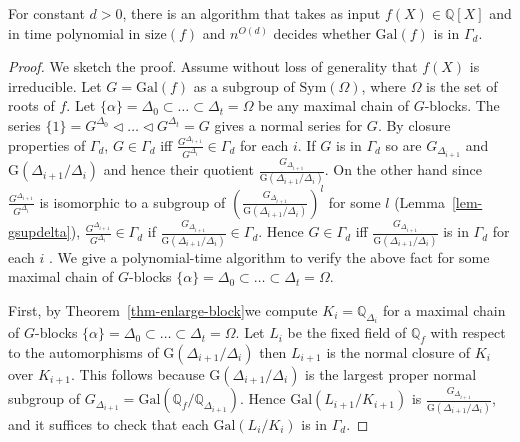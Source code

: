 \documentclass{llncs}
\newcommand{\size}[1]{{\ensuremath{\mathrm{size}\left(#1\right)}}}
\newcommand{\Gal}[1]{{\ensuremath{\mathrm{Gal}\left(#1\right)}}}
\newcommand{\Gof}[1]{{\ensuremath{\mathrm{G}\left(#1\right)}}}
\newcommand{\Sym}[1]{{\ensuremath{\mathrm{Sym}\left(#1\right)}}}
\newcommand{\Q}{\ensuremath{\mathbb{Q}}}
\begin{document}
\begin{theorem}\label{thm-gammad-test}
  For constant $d>0$, there is an algorithm that takes as input $f(X)
  \in \Q[X]$ and in time polynomial in $\size{f}$ and $n^{O(d)}$
  decides whether $\Gal{f}$ is in $\Gamma_d$.
\end{theorem}
\begin{proof}
  We sketch the proof. Assume without loss of generality that $f(X)$
  is irreducible.  Let $G=\Gal{f}$ as a subgroup of $\Sym{\Omega}$,
  where $\Omega$ is the set of roots of $f$. Let $\{ \alpha \} =
  \Delta_0 \subset \ldots \subset \Delta_t = \Omega$ be any maximal
  chain of $G$-blocks. The series $ \{ 1 \} = G^{\Delta_0} \lhd \ldots
  \lhd G^{\Delta_t} = G$ gives a normal series for $G$. By closure
  properties of $\Gamma_d$, $G\in \Gamma_d$ iff
  $\frac{G^{\Delta_{i+1}}}{G^{\Delta_i}}\in\Gamma_d$ for each $i$. If
  $G$ is in $\Gamma_d$ so are $G_{\Delta_{i+1}}$ and
  $\Gof{\Delta_{i+1}/\Delta_i}$ and hence their quotient
  $\frac{G_{\Delta_{i+1}}}{\Gof{\Delta_{i+1}/\Delta_i}}$. On the other
  hand since $\frac{G^{\Delta_{i+1}}}{G^{\Delta_i}}$ is isomorphic to
  a subgroup of
  $\left(\frac{G_{\Delta_{i+1}}}{\Gof{\Delta_{i+1}/\Delta_i}}\right)^l$
  for some $l$ (Lemma~\ref{lem-gsupdelta}),
  $\frac{G^{\Delta_{i+1}}}{G^{\Delta_i}}\in\Gamma_d$ if
  $\frac{G_{\Delta_{i+1}}}{\Gof{\Delta_{i+1}/\Delta_i}}\in\Gamma_d$.
  Hence $G\in\Gamma_d$ iff
  $\frac{G_{\Delta_{i+1}}}{\Gof{\Delta_{i+1}/\Delta_i}}$ is in
  $\Gamma_d$ for each $i$ . We give a polynomial-time algorithm to
  verify the above fact for some maximal chain of $G$-blocks $\{
  \alpha \} = \Delta_0 \subset \ldots \subset \Delta_t = \Omega$.

  First, by Theorem~\ref{thm-enlarge-block}we compute $K_i =
  \Q_{\Delta_i}$ for a maximal chain of $G$-blocks $\{ \alpha \} =
  \Delta_0 \subset \ldots \subset \Delta_t = \Omega$. Let $L_i$ be the
  fixed field of $\Q_f$ with respect to the automorphisms of
  $\Gof{\Delta_{i+1}/\Delta_i}$ then $L_{i+1}$ is the normal closure
  of $K_i$ over $K_{i+1}$. This follows because
  $\Gof{\Delta_{i+1}/\Delta_i}$ is the largest proper normal subgroup
  of $G_{\Delta_{i+1}}=\Gal{\Q_f/\Q_{\Delta_{i+1}}}$. Hence
  $\Gal{L_{i+1}/K_{i+1}}$ is
  $\frac{G_{\Delta_{i+1}}}{\Gof{\Delta_{i+1}/\Delta_i}}$, and it
  suffices to check that each $\Gal{L_i/K_i}$ is in $\Gamma_d$.


\end{proof}
\end{document}
